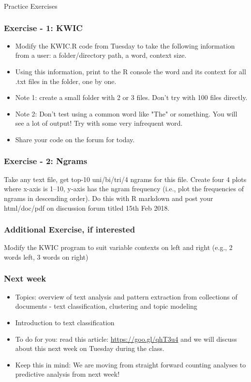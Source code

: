 \documentclass{beamer}
\begin{document}
\begin{frame}
\Large Practice Exercises
\end{frame}

\begin{frame}
\frametitle{Exercise - 1: KWIC}
\begin{itemize}
\item Modify the KWIC.R code from Tuesday to take the following information from a user: a folder/directory path, a word, context size. 
\item Using this information, print to the R console the word and its context for all .txt files in the folder, one by one.
\item Note 1: create a small folder with 2 or 3 files. Don't try with 100 files directly.
\item Note 2: Don't test using a common word like "The" or something. You will see a lot of output! Try with some very infrequent word.
\item Share your code on the forum for today.
\end{itemize}
\end{frame}

\begin{frame}
\frametitle{Exercise - 2: Ngrams}
Take any text file, get top-10 uni/bi/tri/4 ngrams for this file. Create four 4 plots where x-axis is 1--10, y-axis has the ngram frequency (i.e., plot the frequencies of ngrams in descending order). Do this with R markdown and post your html/doc/pdf on discussion forum titled 15th Feb 2018. 
\end{frame}

\begin{frame}
\frametitle{Additional Exercise, if interested}
Modify the KWIC program to suit variable contexts on left and right (e.g., 2 words left, 3 words on right)
\end{frame}

\begin{frame}
\frametitle{Next week}
\begin{itemize}
\item Topics: overview of text analysis and pattern extraction from collections of documents - text classification, clustering and topic modeling
\item Introduction to text classification
\item To do for you: read this article: \url{https://goo.gl/qhT3u4} and we will discuss about this next week on Tuesday during the class. 
\item Keep this in mind: We are moving from straight forward counting analyses to predictive analysis from next week!
\end{itemize}
\end{frame}
\end{document}
